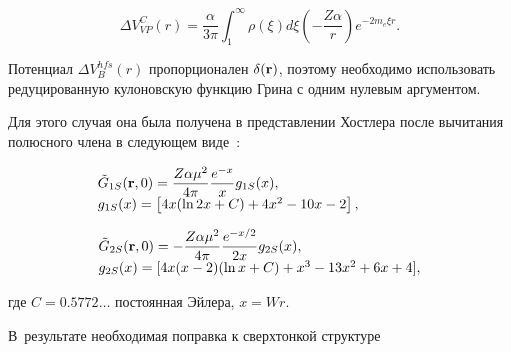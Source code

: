 \begin{equation}

\label{eq:modcol}

\Delta V^C_{VP}(r)=\frac{\alpha}{3\pi}\int_1^\infty\rho(\xi)d\xi\left(-\frac{Z\alpha}{r}\right)

e^{-2m_e\xi r}.

\end{equation}

Потенциал $\Delta V_B^{hfs}(r)$ пропорционален $\delta({\bf r})$, поэтому необходимо использовать редуцированную кулоновскую функцию Грина с одним нулевым аргументом.

Для этого случая она была получена в представлении Хостлера после вычитания полюсного члена в следующем  виде~\cite{hameka}:

\begin{equation}

\label{eq:green1sr}

\begin{array}{l}

\displaystyle

\tilde G_{1S}({\bf r}, 0)=\frac{Z\alpha\mu^2}{4\pi}\frac{e^{-x}}{x}g_{1S}(x),\\

g_{1S}(x)=\left[4x(\ln 2x+C)+4x^2-10x-2\right],

\end{array}

\hspace{1.6cm}

\end{equation}

\begin{equation}

\label{eq:green2sr}

\begin{array}{l}

\displaystyle

\tilde G_{2S}({\bf r}, 0)=-\frac{Z\alpha\mu^2}{4\pi}\frac{e^{-x/2}}{2x}g_{2S}(x),\\

g_{2S}(x)=[4x(x-2)(\ln x+C)+x^3- 13x^2+6x+4],

\end{array}

\end{equation}

где $C=0.5772\dots$ постоянная Эйлера, $x=Wr$. 

В~результате необходимая поправка к сверхтонкой структуре

